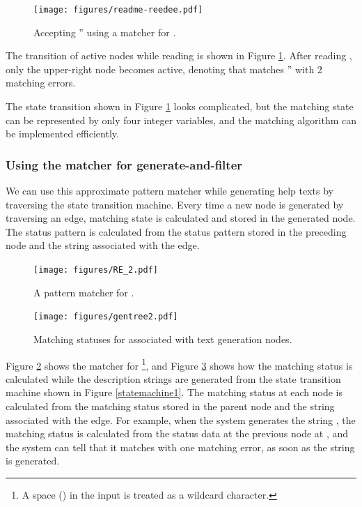 \documentclass[manuscript,screen,review]{acmart}
\begin{document}
\begin{figure}[htb]
  \centerline{\texttt{[image: figures/readme-reedee.pdf]}}
  \caption{Accepting '' using a matcher for .}
  \label{readme-reedee}
\end{figure}

The transition of active nodes while reading
 is shown in Figure \ref{readme-reedee}.
After reading ,
only the upper-right node becomes active,
denoting that  matches
'' with 2 matching errors.

The state transition shown in 
Figure \ref{readme-reedee} looks complicated, but
the matching state can be represented by only four integer variables, and
the matching algorithm can be implemented efficiently.

\subsubsection{Using the matcher for generate-and-filter}

We can use this approximate pattern matcher while generating
help texts by traversing the state transition machine.
%
Every time a new node is generated by traversing an edge,
matching state is calculated and stored in the generated node.
The status pattern is calculated from the status pattern
stored in the preceding node and the string associated with the edge.

\begin{figure}[htb]
  \centerline{\texttt{[image: figures/RE\_2.pdf]}}
  \caption{A pattern matcher for .}
  \label{RE_2}
\end{figure}

\begin{figure}[bth]
\centerline{\texttt{[image: figures/gentree2.pdf]}}
\caption{Matching statuses for  associated with text generation nodes.}
\label{gentree2}
\end{figure}

Figure \ref{RE_2} shows the matcher for \footnote{
  A space (\qtt{ }) in the input is treated as a wildcard character.
},
and Figure \ref{gentree2} shows how the matching status is calculated while the
description strings are generated from the state transition machine
shown in Figure \ref{statemachine1}.
The matching status at each node is calculated from the matching status
stored in the parent node and the string associated with the edge.
For example, when the system generates the string
,
the matching status is calculated from the status data at the previous node at
, and
the system can tell that it matches  with one matching error,
as soon as the string is generated.
\end{document}
